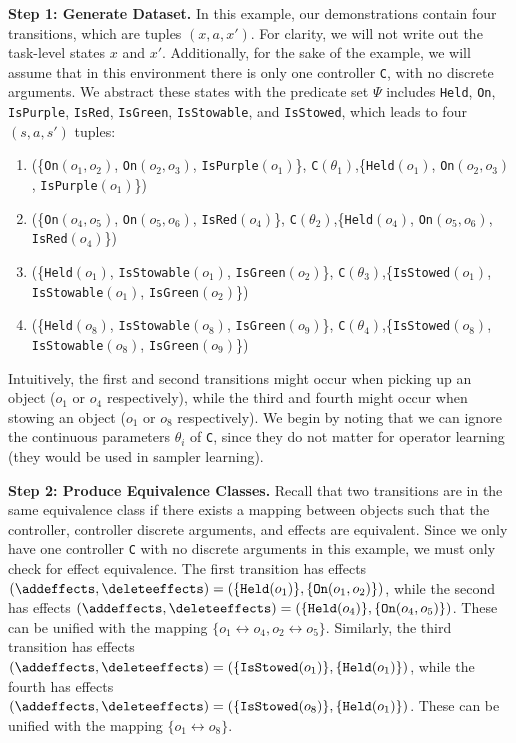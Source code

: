 \textbf{Step 1: Generate Dataset.} In this example, our demonstrations contain four transitions, which are tuples $(x, a, x')$. For clarity, we will not write out the task-level states $x$ and $x'$. Additionally, for the sake of the example, we will assume that in this environment there is only one controller \texttt{C}, with no discrete arguments. We abstract these states with the predicate set $\Psi$ includes \texttt{Held}, \texttt{On}, \texttt{IsPurple}, \texttt{IsRed}, \texttt{IsGreen}, \texttt{IsStowable}, and \texttt{IsStowed}, which leads to four $(s, a, s')$ tuples:
\begin{enumerate}
    \item (\{\texttt{On}$(o_1, o_2)$, \texttt{On}$(o_2, o_3)$, \texttt{IsPurple}$(o_{1})$\}, \texttt{C}$(\theta_1)$,\{\texttt{Held}$(o_1)$, \texttt{On}$(o_2, o_3)$,
    \texttt{IsPurple}$(o_{1})$\})
    \item (\{\texttt{On}$(o_4, o_5)$, \texttt{On}$(o_{5}, o_{6})$, \texttt{IsRed}$(o_{4})$\}, \texttt{C}$(\theta_2)$,\{\texttt{Held}$(o_4)$, \texttt{On}$(o_{5}, o_{6})$, \texttt{IsRed}$(o_4)$\})
    \item (\{\texttt{Held}$(o_1)$, \texttt{IsStowable}$(o_1)$,
    \texttt{IsGreen}$(o_2)$\}, \texttt{C}$(\theta_3)$,\{\texttt{IsStowed}$(o_1)$, \texttt{IsStowable}$(o_1)$, \texttt{IsGreen}$(o_2)$\})
    \item (\{\texttt{Held}$(o_8)$, \texttt{IsStowable}$(o_8)$, \texttt{IsGreen}$(o_9)$\}, \texttt{C}$(\theta_4)$,\{\texttt{IsStowed}$(o_8)$, \texttt{IsStowable}$(o_8)$, \texttt{IsGreen}$(o_9)$\})
\end{enumerate}

Intuitively, the first and second transitions might occur when picking up an object ($o_1$ or $o_4$ respectively), while the third and fourth might occur when stowing an object ($o_1$ or $o_8$ respectively). We begin by noting that we can ignore the continuous parameters $\theta_i$ of \texttt{C}, since they do not matter for operator learning (they would be used in sampler learning).

\textbf{Step 2: Produce Equivalence Classes.} Recall that two transitions are in the same equivalence class if there exists a mapping between objects such that the controller, controller discrete arguments, and effects are equivalent. Since we only have one controller \texttt{C} with no discrete arguments in this example, we must only check for effect equivalence. The first transition has effects $(\addeffects, \deleteeffects) = (\{\texttt{Held}(o_1)\}, \{\texttt{On}(o_1,o_2)\})$, while the second has effects $(\addeffects, \deleteeffects) = (\{\texttt{Held}(o_4)\}, \{\texttt{On}(o_4,o_5)\})$. These can be unified with the mapping $\{o_1 \leftrightarrow o_4, o_2 \leftrightarrow o_5\}$. Similarly, the third transition has effects $(\addeffects, \deleteeffects) = (\{\texttt{IsStowed}(o_1)\}, \{\texttt{Held}(o_1)\})$, while the fourth has effects $(\addeffects, \deleteeffects) = (\{\texttt{IsStowed}(o_8)\}, \{\texttt{Held}(o_1)\})$. These can be unified with the mapping $\{o_1 \leftrightarrow o_8\}$.

